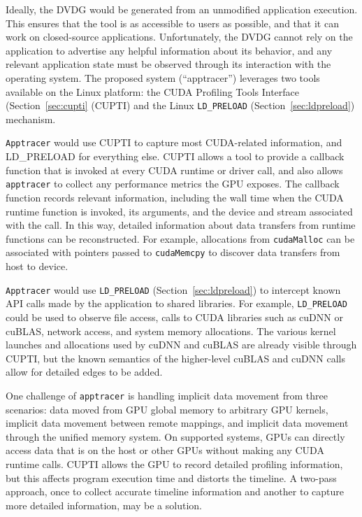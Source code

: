 Ideally, the DVDG would be generated from an unmodified application execution.
This ensures that the tool is as accessible to users as possible, and that it can work on closed-source applications.
Unfortunately, the DVDG cannot rely on the application to advertise any helpful information about its behavior, and any relevant application state must be observed through its interaction with the operating system.
The proposed system (``apptracer'') leverages two tools available on the Linux platform: the CUDA Profiling Tools Interface (Section~\ref{sec:cupti} (CUPTI) and the Linux \texttt{LD\_PRELOAD} (Section~\ref{sec:ldpreload}) mechanism.

\texttt{Apptracer} would use CUPTI to capture most CUDA-related information, and LD\_PRELOAD for everything else.
CUPTI allows a tool to provide a callback function that is invoked at every CUDA runtime or driver call, and also allows \texttt{apptracer} to collect any performance metrics the GPU exposes.
The callback function records relevant information, including the wall time when the CUDA runtime function is invoked, its arguments, and the device and stream associated with the call.
In this way, detailed information about data transfers from runtime functions can be reconstructed.
For example, allocations from \texttt{cudaMalloc} can be associated with pointers passed to \texttt{cudaMemcpy} to discover data transfers from host to device.

\texttt{Apptracer} would use \texttt{LD\_PRELOAD} (Section~\ref{sec:ldpreload}) to intercept known API calls made by the application to shared libraries.
For example, \texttt{LD\_PRELOAD} could be used to observe file access, calls to CUDA libraries such as cuDNN or cuBLAS, network access, and system memory allocations.
The various kernel launches and allocations used by cuDNN and cuBLAS are already visible through CUPTI, but the known semantics of the higher-level cuBLAS and cuDNN calls allow for detailed edges to be added.

One challenge of \texttt{apptracer} is handling implicit data movement from three scenarios:
data moved from GPU global memory to arbitrary GPU kernels, implicit data movement between remote mappings, and implicit data movement through the unified memory system.
On supported systems, GPUs can directly access data that is on the host or other GPUs without making any CUDA runtime calls.
CUPTI allows the GPU to record detailed profiling information, but this affects program execution time and distorts the timeline.
A two-pass approach, once to collect accurate timeline information and another to capture more detailed information, may be a solution.

